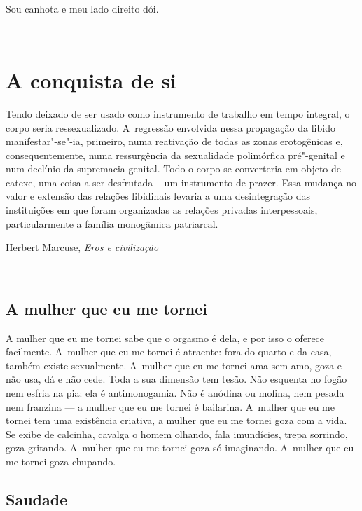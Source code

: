 ​

\lonelyepigraph{}

\epigraph{Sou canhota e meu lado direito dói.}{}

 

\part{A conquista de si}

\lonelyepigraph{}

\epigraph{Tendo deixado de ser usado como instrumento de trabalho em tempo integral, o corpo seria ressexualizado. A~regressão envolvida nessa propagação da libido manifestar"-se"-ia, primeiro, numa reativação de todas as zonas erotogênicas e, consequentemente, numa ressurgência da sexualidade polimórfica pré"-genital e num declínio da supremacia genital. Todo o corpo se converteria em objeto de catexe, uma coisa a ser desfrutada – um instrumento de prazer. Essa mudança no valor e extensão das relações libidinais levaria a uma desintegração das instituições em que foram organizadas as relações privadas interpessoais, particularmente a família monogâmica patriarcal.}{Herbert Marcuse, \emph{Eros e civilização}}



​

\epigraph{}{} 

\chapter{A mulher que eu me tornei}

A mulher que eu me tornei sabe que o orgasmo é dela, e por isso o
oferece facilmente. A~mulher que eu me tornei é atraente: fora do quarto
e da casa, também existe sexualmente. A~mulher que eu me tornei ama sem
amo, goza e não usa, dá e não cede.{} Toda a sua dimensão tem
tesão.{} Não esquenta no fogão nem esfria na pia: ela é
antimonogamia. Não é anódina ou mofina, nem pesada nem franzina --- a
mulher que eu me tornei é bailarina. A~mulher que eu me tornei tem uma
existência criativa, a mulher que eu me tornei goza com a vida. Se exibe
de calcinha, cavalga o homem olhando, fala imundícies, trepa sorrindo,
goza gritando. A~mulher que eu me tornei goza só imaginando. A~mulher
que eu me tornei goza chupando.

\chapter{Saudade}

